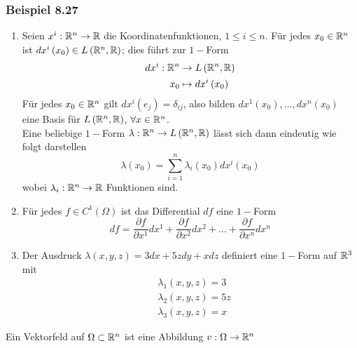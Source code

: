 \subsubsection*{Beispiel 8.27}
\begin{enumerate}
\item Seien $x^i:\mathbb{R}^n\to\mathbb{R}$ die Koordinatenfunktionen, $1\leq i\leq n$. Für jedes $x_0\in\mathbb{R}^n$ ist $dx^i\left(x_0\right)\in L\left( \mathbb{R}^n,\mathbb{R}\right)$; dies führt zur $1-$Form
\begin{align*}
dx^i:\mathbb{R}^n&\to L\left( \mathbb{R}^n,\mathbb{R}\right)\\
x_0 &\mapsto dx^i\left( x_0\right)
\end{align*}
Für jedes $x_0\in\mathbb{R}^n$ gilt $dx^i\left(e_j\right)=\delta_{ij}$, also bilden $dx^1\left( x_0\right),\dots,dx^n\left( x_0\right)$ eine Basis für $L\left(\mathbb{R}^n,\mathbb{R}\right)$, $\forall x\in\mathbb{R}^n$.\\

Eine beliebige $1-$Form $\lambda :\mathbb{R}^n\to L\left(\mathbb{R}^n,\mathbb{R}\right)$ lässt sich dann eindeutig wie folgt darstellen \[\lambda \left( {{x_0}} \right) = \sum\limits_{i = 1}^n {{\lambda _i}\left( {{x_0}} \right)d{x^i}\left( {{x_0}} \right)} \] wobei $\lambda_i:\mathbb{R}^n\to\mathbb{R}$ Funktionen sind.
\item Für jedes $f\in C^1\left(\Omega\right)$ ist das Differential $df$ eine $1-$Form \[df = \frac{{\partial f}}{{\partial {x^1}}}d{x^1} + \frac{{\partial f}}{{\partial {x^2}}}d{x^2} +  \ldots  + \frac{{\partial f}}{{\partial {x^n}}}d{x^n}\]
\item Der Ausdruck $\lambda\left(x,y,z\right)=3dx+5zdy+xdz$ definiert eine $1-$Form auf $\mathbb{R}^3$ mit
\begin{align*}
& \lambda_1\left(x,y,z\right)=3\\
& \lambda_2\left(x,y,z\right)=5z\\
& \lambda_3\left(x,y,z\right)=x
\end{align*}
\end{enumerate}
\begin{definition}{8.28}
Ein Vektorfeld auf $\Omega\subset\mathbb{R}^n$ ist eine Abbildung $v:\Omega\to\mathbb{R}^n$
\end{definition}

